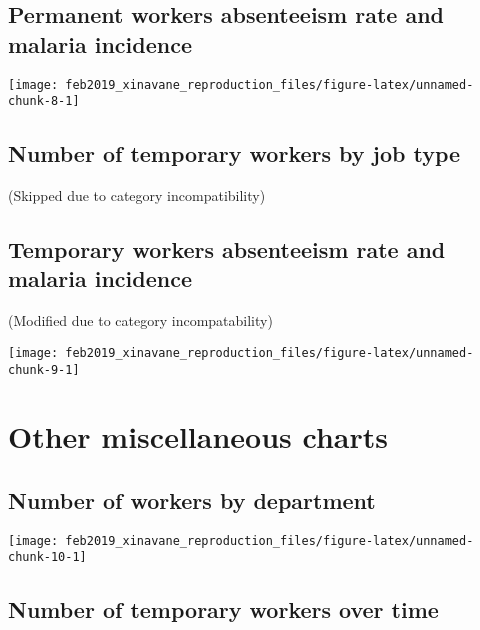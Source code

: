 \documentclass[]{article}
\begin{document}
\subsection{Permanent workers absenteeism rate and malaria
incidence}\label{permanent-workers-absenteeism-rate-and-malaria-incidence}

\begin{center}\texttt{[image: feb2019\_xinavane\_reproduction\_files/figure-latex/unnamed-chunk-8-1]} \end{center}

\subsection{Number of temporary workers by job
type}\label{number-of-temporary-workers-by-job-type}

(Skipped due to category incompatibility)

\subsection{Temporary workers absenteeism rate and malaria
incidence}\label{temporary-workers-absenteeism-rate-and-malaria-incidence}

(Modified due to category incompatability)

\begin{center}\texttt{[image: feb2019\_xinavane\_reproduction\_files/figure-latex/unnamed-chunk-9-1]} \end{center}

\newpage

\section{Other miscellaneous charts}\label{other-miscellaneous-charts}

\subsection{Number of workers by
department}\label{number-of-workers-by-department}

\begin{center}\texttt{[image: feb2019\_xinavane\_reproduction\_files/figure-latex/unnamed-chunk-10-1]} \end{center}

\subsection{Number of temporary workers over
time}\label{number-of-temporary-workers-over-time}
\end{document}
